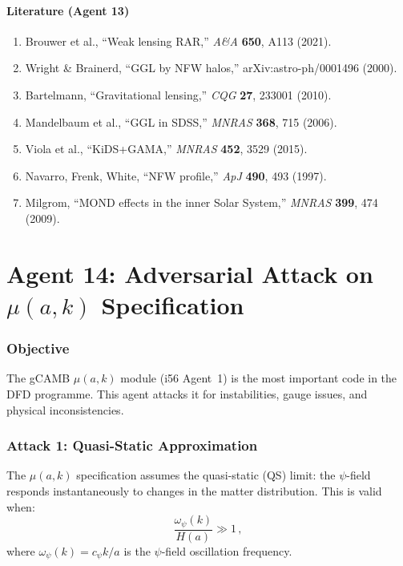 \documentclass[11pt,a4paper]{article}
\begin{document}
\subsection{Literature (Agent 13)}

\begin{enumerate}
\item Brouwer et al., ``Weak lensing RAR,'' \textit{A\&A} \textbf{650}, A113 (2021).
\item Wright \& Brainerd, ``GGL by NFW halos,'' arXiv:astro-ph/0001496 (2000).
\item Bartelmann, ``Gravitational lensing,'' \textit{CQG} \textbf{27}, 233001 (2010).
\item Mandelbaum et al., ``GGL in SDSS,'' \textit{MNRAS} \textbf{368}, 715 (2006).
\item Viola et al., ``KiDS+GAMA,'' \textit{MNRAS} \textbf{452}, 3529 (2015).
\item Navarro, Frenk, White, ``NFW profile,'' \textit{ApJ} \textbf{490}, 493 (1997).
\item Milgrom, ``MOND effects in the inner Solar System,'' \textit{MNRAS} \textbf{399}, 474 (2009).
\end{enumerate}


\part{Agent 14: Adversarial Attack on $\mu(a,k)$ Specification}
\label{part:adversarial-mu}

\section{Objective}

The gCAMB $\mu(a,k)$ module (i56 Agent~1) is the most important code in the DFD programme. This agent attacks it for instabilities, gauge issues, and physical inconsistencies.

\section{Attack 1: Quasi-Static Approximation}

The $\mu(a,k)$ specification assumes the quasi-static (QS) limit: the $\psi$-field responds instantaneously to changes in the matter distribution. This is valid when:
\begin{equation}
\frac{\omega_\psi(k)}{H(a)} \gg 1\,,
\end{equation}
where $\omega_\psi(k) = c_\psi k / a$ is the $\psi$-field oscillation frequency.
\end{document}
